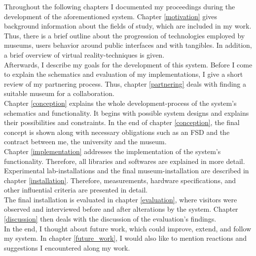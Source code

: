 Throughout the following chapters I documented my proceedings during the development of the aforementioned system. Chapter \ref{motivation} gives background information about the fields of study, which are included in my work. Thus, there is a brief outline about the progression of technologies employed by museums, users behavior around public interfaces and with tangibles. In addition, a brief overview of virtual reality-techniques is given.
\\
Afterwards, I describe my goals for the development of this system. Before I come to explain the schematics and evaluation of my implementations, I give a short review of my partnering process. Thus, chapter \ref{partnering} deals with finding a suitable museum for a collaboration. 
\\
Chapter \ref{conception} explains the whole development-process of the system's schematics and functionality. It begins with possible system designs and explains their possibilities and constraints. In the end of chapter \ref{conception}, the final concept is shown along with necessary obligations such as an \ac{FSD} and the contract between me, the university and the museum.
\\
Chapter \ref{implementation} addresses the implementation of the system's functionality. Therefore, all libraries and softwares are explained in more detail.
\\
Experimental lab-installations and the final museum-installation are described in chapter \ref{installation}. Therefore, measurements, hardware specifications, and other influential criteria are presented in detail.
\\
The final installation is evaluated in chapter \ref{evaluation}, where visitors were observed and interviewed before and after alterations by the system. Chapter \ref{discussion} then deals with the discussion of the evaluation's findings.
\\
In the end, I thought about future work, which could improve, extend, and follow my system. In chapter \ref{future_work}, I would also like to mention reactions and suggestions I encountered along my work.

%
